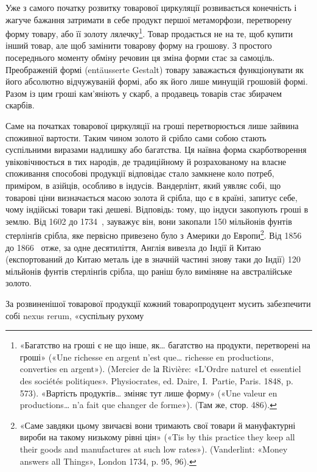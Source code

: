 Уже з самого початку розвитку товарової циркуляції розвивається
конечність і жагуче бажання затримати в себе продукт
першої метаморфози, перетворену форму товару, або її золоту
лялечку\footnote{
«Багатство на гроші є не що інше, як\dots{} багатство на продукти,
перетворені на гроші» («Une richesse en argent n’est que\dots{} richesse en
productions, converties en argent»). (Mercier de lа Rivière: «L’Ordre naturel
et essentiel des sociétés politiques». Physiocrates, ed. Daire, I.~Partie, Paris.
1848, p. 573). «Вартість продуктів\dots{} зміняє тут лише форму» («Une valeur
en productions\dots{} n’a fait que changer de forme»). (Там же, стор. 486).
}. Товар продається не на те, щоб купити інший товар,
але щоб замінити товарову форму на грошову. З простого посереднього
моменту обміну речовин ця зміна форми стає за самоціль.
Преображеній формі (entäusserte Gestalt) товару заважається
функціонувати як його абсолютно відчужуваній формі,
або як його лише минущій грошовій формі. Разом із цим гроші
кам’яніють у скарб, а продавець товарів стає збирачем скарбів.

Саме на початках товарової циркуляції на гроші перетворюється
лише зайвина споживної вартости. Таким чином золото
й срібло сами собою стають суспільними виразами надлишку або
багатства. Ця наївна форма скарботворення увіковічнюється в
тих народів, де традиційному й розрахованому на власне споживання
способові продукції відповідає стало замкнене коло потреб,
приміром, в азійців, особливо в індусів. Вандерлінт, який уявляє
собі, що товарові ціни визначається масою золота й срібла, що
є в країні, запитує себе, чому індійські товари такі дешеві.
Відповідь: тому, що індуси закопують гроші в землю. Від 1602
до 1734~, зауважує він, вони закопали 150 мільйонів фунтів
стерлінґів срібла, яке первісно привезено було з Америки до
Европи\footnote{
«Саме завдяки цьому звичаєві вони тримають свої товари й мануфактурні
вироби на такому низькому рівні цін» («Tis by this practice
they keep all their goods and manufactures at such low rates»). (Vanderlint:
«Money answers all Things», London 1734, p. 95, 96).
}. Від 1856 до 1866~ отже, за одне десятиліття, Англія
вивезла до Індії й Китаю (експортований до Китаю металь іде в
значній частині знову таки до Індії) 120 мільйонів фунтів стерлінґів
срібла, що раніш було виміняне на австралійське золото.

За розвиненішої товарової продукції кожний товаропродуцент
мусить забезпечити собі nexus rerum, «суспільну рухому
\parbreak{}  %
